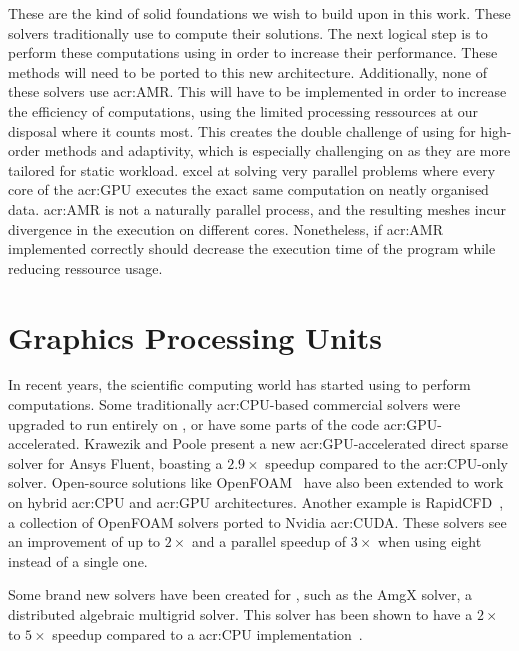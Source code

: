 These are the kind of solid foundations we wish to build upon in this work. These solvers
traditionally use  to compute their solutions. The next logical step is to
perform these computations using  in order to increase their performance. These
methods will need to be ported to this new architecture. Additionally, none of these solvers use
\acrfull{acr:AMR}. This will have to be implemented in order to increase the efficiency of
computations, using the limited processing ressources at our disposal where it counts most. This
creates the double challenge of using  for high-order methods and adaptivity,
which is especially challenging on  as they are more tailored for static
workload.  excel at solving very parallel problems where every core of the
\acrshort{acr:GPU} executes the exact same computation on neatly organised data. \Acrshort{acr:AMR}
is not a naturally parallel process, and the resulting meshes incur divergence in the execution on
different cores. Nonetheless, if \Acrshort{acr:AMR} implemented correctly should decrease the
execution time of the program while reducing ressource usage.

\section{Graphics Processing Units}\label{section:literature_review:gpu}

In recent years, the scientific computing world has started using  to perform
computations. Some traditionally \acrshort{acr:CPU}-based commercial solvers were upgraded to run
entirely on , or have some parts of the code \acrshort{acr:GPU}-accelerated.
Krawezik and Poole present a new \acrshort{acr:GPU}-accelerated direct sparse solver for Ansys
Fluent, boasting a \(2.9 \times \) speedup compared to the \acrshort{acr:CPU}-only solver.
Open-source solutions like OpenFOAM~\cite{Alonazi2015} have also been extended to work on hybrid
\acrshort{acr:CPU} and \acrshort{acr:GPU} architectures. Another example is
RapidCFD~\cite{SimFlow2020}, a collection of OpenFOAM solvers ported to Nvidia \acrshort{acr:CUDA}.
These solvers see an improvement of up to \(2 \times \) and a parallel speedup of \(3 \times \)
when using eight  instead of a single one.

Some brand new solvers have been created for , such as the AmgX solver, a
distributed algebraic multigrid solver. This solver has been shown to have a \(2 \times \) to \(5
\times \) speedup compared to a \acrshort{acr:CPU} implementation~\cite{Naumov2015}.

